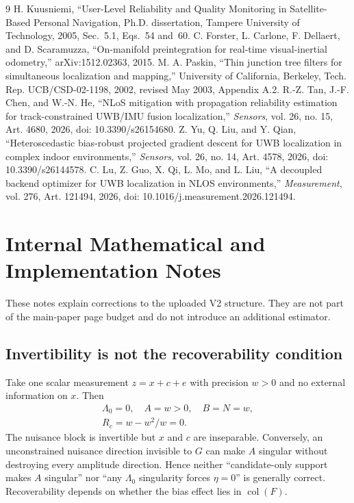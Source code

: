 \documentclass[conference]{IEEEtran}%
\newif\iftechnicalnotes
\begin{document}
\begin{thebibliography}{9}
H. Kuusniemi, ``User-Level Reliability and Quality Monitoring in Satellite-Based Personal Navigation, Ph.D. dissertation, Tampere University of Technology, 2005, Sec.~5.1, Eqs.~54 and~60.
C. Forster, L. Carlone, F. Dellaert, and D. Scaramuzza,
``On-manifold preintegration for real-time visual-inertial odometry,''
arXiv:1512.02363, 2015.
M. A. Paskin, ``Thin junction tree filters for simultaneous localization and mapping,''
University of California, Berkeley, Tech. Rep. UCB/CSD-02-1198,
2002, revised May 2003, Appendix A.2.
R.-Z. Tan, J.-F. Chen, and W.-N. He,
``NLoS mitigation with propagation reliability estimation for track-constrained UWB/IMU fusion localization,''
\emph{Sensors}, vol. 26, no. 15, Art. 4680, 2026,
doi: 10.3390/s26154680.
Z. Yu, Q. Liu, and Y. Qian,
``Heteroscedastic bias-robust projected gradient descent for UWB localization in complex indoor environments,''
\emph{Sensors}, vol. 26, no. 14, Art. 4578, 2026,
doi: 10.3390/s26144578.
C. Lu, Z. Guo, X. Qi, L. Mo, and L. Liu,
``A decoupled backend optimizer for UWB localization in NLOS environments,''
\emph{Measurement}, vol. 276, Art. 121494, 2026,
doi: 10.1016/j.measurement.2026.121494.
\end{thebibliography}

\iftechnicalnotes
\clearpage
\appendices
\section{Internal Mathematical and Implementation Notes}
\label{app:math}
These notes explain corrections to the uploaded V2 structure. They are not part of the main-paper page budget and do not introduce an additional estimator.

\subsection{Invertibility is not the recoverability condition}
Take one scalar measurement $z=x+c+e$ with precision $w>0$ and no external information on $x$. Then
\begin{equation}
 \begin{gathered}
 \Lambda_0=0,\quad A=w>0,\quad B=N=w,\\
 R_c=w-w^2/w=0.
 \end{gathered}
\end{equation}
The nuisance block is invertible but $x$ and $c$ are inseparable. Conversely, an unconstrained nuisance direction invisible to $G$ can make $A$ singular without destroying every amplitude direction. Hence neither ``candidate-only support makes $A$ singular'' nor ``any $\Lambda_0$ singularity forces $\eta=0$'' is generally correct. Recoverability depends on whether the bias effect lies in $\operatorname{col}(F)$.
\end{document}
